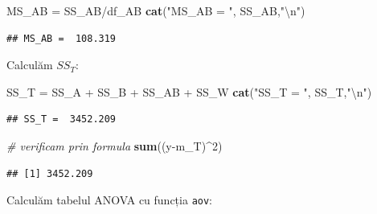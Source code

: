 \documentclass[]{article}
\newenvironment{Shaded}{\begin{snugshade}}{\end{snugshade}}
\newcommand{\KeywordTok}[1]{\textcolor[rgb]{0.13,0.29,0.53}{\textbf{{#1}}}}
\newcommand{\DataTypeTok}[1]{\textcolor[rgb]{0.13,0.29,0.53}{{#1}}}
\newcommand{\DecValTok}[1]{\textcolor[rgb]{0.00,0.00,0.81}{{#1}}}
\newcommand{\CharTok}[1]{\textcolor[rgb]{0.31,0.60,0.02}{{#1}}}
\newcommand{\StringTok}[1]{\textcolor[rgb]{0.31,0.60,0.02}{{#1}}}
\newcommand{\CommentTok}[1]{\textcolor[rgb]{0.56,0.35,0.01}{\textit{{#1}}}}
\newcommand{\NormalTok}[1]{{#1}}
\begin{document}
\begin{Shaded}
\begin{Highlighting}[]
\NormalTok{MS_AB =}\StringTok{ }\NormalTok{SS_AB/df_AB}
\KeywordTok{cat}\NormalTok{(}\StringTok{"MS_AB = "}\NormalTok{, SS_AB,}\StringTok{"}\CharTok{\textbackslash{}n}\StringTok{"}\NormalTok{)}
\end{Highlighting}
\end{Shaded}

\begin{verbatim}
## MS_AB =  108.319
\end{verbatim}

Calculăm \(SS_T\):

\begin{Shaded}
\begin{Highlighting}[]
\NormalTok{SS_T =}\StringTok{ }\NormalTok{SS_A +}\StringTok{ }\NormalTok{SS_B +}\StringTok{ }\NormalTok{SS_AB +}\StringTok{ }\NormalTok{SS_W}
\KeywordTok{cat}\NormalTok{(}\StringTok{"SS_T = "}\NormalTok{, SS_T,}\StringTok{"}\CharTok{\textbackslash{}n}\StringTok{"}\NormalTok{)}
\end{Highlighting}
\end{Shaded}

\begin{verbatim}
## SS_T =  3452.209
\end{verbatim}

\begin{Shaded}
\begin{Highlighting}[]
\CommentTok{# verificam prin formula}
\KeywordTok{sum}\NormalTok{((y-m_T)^}\DecValTok{2}\NormalTok{)}
\end{Highlighting}
\end{Shaded}

\begin{verbatim}
## [1] 3452.209
\end{verbatim}

Calculăm tabelul ANOVA cu funcția \texttt{aov}:

\begin{Shaded}
\end{Shaded}
\end{document}
